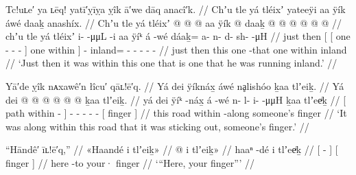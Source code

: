 \ex\label{ex:91-168-running-inland-within-this-one}%
%
\begingl
	\glpreamble	Tc!uʟe′ ya ʟēq! yatī′ỵīỵa ỵîk ā′we dāq anacî′k. //
	\glpreamble	Chʼu tle yá tléixʼ yateeÿi aa ÿík áwé daaḵ anashíx. //
	\gla	Chʼu tle {} yá {} tléixʼ  @ {} @ {} @ {} {} aa ÿík {}
		 @ {}
		daaḵ @  @ {} @ {} @ {} @ {} @ {} //
	\glb	chʼu tle {} yá {} tléixʼ i-  -μμL -i {} aa ÿíᵏ {}
		á -wé
		dáaḵ= a- n- d- sh-  -μH //
	\glc	just then {}[ 
			{}[ one -  - - {}]
			one within {}]
		 -
		inland= - - - -  - //
	\gld	just then {} this {} one  {} {} -that {}
			one within {}
		 {}
		inland  {} {} {} {} {} //
	\glft	‘Just then it was within this one that is one that he was running inland.’
		//
\endgl
\xe



\ex\label{ex:91-169-this-one-within-finger-sticks-out}%
%
\begingl
	\glpreamble	Yā′de ỵîk nᴀxawê′n łîcu′ qāʟ!ē′q. //
	\glpreamble	Yá dei ÿíknáx̱ áwé nḁlishóo ḵaa tlʼeiḵ. //
	\gla	{} Yá dei  @ {} {}  @ {}
		 @ {} @ {} @ {} @ {}
		{} ḵaa tlʼeiḵ. {} //
	\glb	{} yá dei ÿíᵏ -náx̱ {} á -wé
		n- l- i-  -μμH
		{} ḵaa tlʼeeͥḵ {} //
	\glc	{}[  path within - {}]
		 -
		- - -  -
		{}[  finger {}] //
	\gld	{} this road within -along {}  {}
		 {} {} {} {}
		{} someone’s finger {} //
	\glft	‘It was along within this road that it was sticking out, someone’s finger.’
		//
\endgl
\xe

\ex\label{ex:91-170-gimme-your-finger}%
%
\begingl
	\glpreamble	“Hāndê′ īʟ!ē′q,” //
	\glpreamble	«\!Haandé i tlʼeiḵ\!» //
	\gla	{}  @ {} {} {} i tlʼeiḵ\!» {} //
	\glb	{} haaⁿ -dé {} {} i tlʼeeͥḵ {} //
	\glc	{}[  - {}] {}[  finger {}] //
	\gld	{} here -to {} {} your· finger {} //
	\glft	‘“Here, your finger”’
		//
\endgl
\xe

